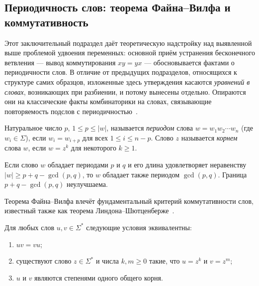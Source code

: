\documentclass[14pt, russian]{scrartcl}
\begin{document}
\subsection{Периодичность слов: теорема Файна--Вилфа и коммутативность}
\label{sec:finewilf}

Этот заключительный подраздел даёт теоретическую надстройку над выявленной выше
проблемой удвоения переменных: основной приём устранения бесконечного ветвления ---
вывод коммутирования $xy = yx$ --- обосновывается фактами о периодичности слов. В
отличие от предыдущих подразделов, относящихся к структуре самих образцов, изложенные
здесь утверждения касаются \textit{уравнений в словах}, возникающих при разбиении, и
потому вынесены отдельно. Опираются они на классические факты комбинаторики на словах,
связывающие повторяемость подслов с периодичностью~\cite{lothaire1997}.

\begin{Definition}
Натуральное число $p$, $1 \le p \le |w|$, называется \textit{периодом} слова
$w = w_1 w_2 \cdots w_n$ (где $w_i \in \Sigma$), если $w_i = w_{i+p}$ для всех
$1 \le i \le n - p$. Слово $z$ называется \textit{корнем} слова $w$, если
$w = z^k$ для некоторого $k \ge 1$.
\end{Definition}

\begin{Theorem}
\label{thm:finewilf}
Если слово $w$ обладает периодами $p$ и $q$ и его длина удовлетворяет неравенству
$|w| \ge p + q - \gcd(p, q)$, то $w$ обладает также периодом $\gcd(p, q)$.
Граница $p + q - \gcd(p, q)$ неулучшаема.
\end{Theorem}

Теорема Файна--Вилфа влечёт фундаментальный критерий коммутативности слов,
известный также как теорема Линдона--Шютценберже~\cite{lyndon1962}.

\begin{Consequent}
\label{cor:commute}
Для любых слов $u, v \in \Sigma^*$ следующие условия эквивалентны:
\begin{enumerate}
\item $u v = v u$;
\item существуют слово $z \in \Sigma^*$ и числа $k, m \ge 0$ такие, что
  $u = z^k$ и $v = z^m$;
\item $u$ и $v$ являются степенями одного общего корня.
\end{enumerate}
\end{Consequent}
\end{document}
